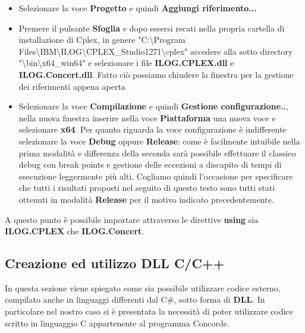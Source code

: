 \documentclass[11pt]{article}
\begin{document}
\begin{flushleft}
    
    \begin{itemize}
        
        \item Selezionare la voce \textbf{Progetto} e quindi \textbf{Aggiungi riferimento...}
        
        \item Premere il pulsante \textbf{Sfoglia} e dopo essersi recati nella propria cartella di installazione di Cplex, in genere "C:\textbackslash Program Files\textbackslash IBM\textbackslash ILOG\textbackslash CPLEX\_Studio1271\textbackslash cplex" accedere alla sotto directory "\textbackslash bin\textbackslash x64\_win64" e selezionare i file \textbf{ILOG.CPLEX.dll} e \textbf{ILOG.Concert.dll}. Fatto ciò possiamo chiudere la finestra per la gestione dei riferimenti appena aperta
        
        \item Selezionare la voce \textbf{Compilazione} e quindi \textbf{Gestione configurazione..}, nella nuova finestra inserire nella voce  \textbf{Piattaforma} una nuova voce e selezionare \textbf{x64}. Per quanto riguarda la voce configurazione è indifferente selezionare la voce \textbf{Debug} oppure \textbf{Release}: come è facilmente intuibile nella prima modalità e differenza della seconda sarà possibile effettuare il classico debug con break points e gestione delle eccezioni a discapito di tempi di esecuzione leggermente più alti. Cogliamo quindi l'occasione per specificare che tutti i risultati proposti nel seguito di questo testo sono tutti stati ottenuti in modalità \textbf{Release} per il motivo indicato precedentemente.
        
    \end{itemize}
    
    
\end{flushleft}

A questo punto è possibile importare attraverso le direttive \textbf{using} sia \textbf{ILOG.CPLEX} che \textbf{ILOG.Concert}.

\subsection*{Creazione ed utilizzo DLL C/C++ }
\label{sec:CreazioneDLL}

In questa sezione viene spiegato come sia possibile utilizzare codice esterno, compilato anche in linguaggi differenti dal C\#, sotto forma di \textbf{DLL}. In particolare nel nostro caso si è presentata la necessità di poter utilizzare codice scritto in linguaggio C appartenente al programma Concorde.
\end{document}
